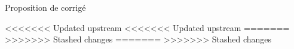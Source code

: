 
\vspace{0.1cm}
\begin{huge}
 Proposition de corrigé
\end{huge}



<<<<<<< Updated upstream
<<<<<<< Updated upstream
=======
>>>>>>> Stashed changes
=======
>>>>>>> Stashed changes





